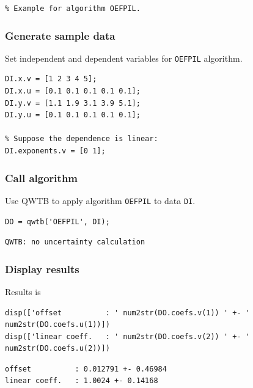 \startcontents[localtoc]

\begin{lstlisting}
% Example for algorithm OEFPIL.
\end{lstlisting}


{}
\subsubsection*{Generate sample data}



Set independent and dependent variables for \texttt{OEFPIL} algorithm.

\begin{lstlisting}
DI.x.v = [1 2 3 4 5];
DI.x.u = [0.1 0.1 0.1 0.1 0.1];
DI.y.v = [1.1 1.9 3.1 3.9 5.1];
DI.y.u = [0.1 0.1 0.1 0.1 0.1];

% Suppose the dependence is linear:
DI.exponents.v = [0 1];
\end{lstlisting}


{}
\subsubsection*{Call algorithm}



Use QWTB to apply algorithm \texttt{OEFPIL} to data \texttt{DI}.

\begin{lstlisting}
DO = qwtb('OEFPIL', DI);
\end{lstlisting}
\begin{lstlisting}[language={},xleftmargin=5pt,frame=none]
QWTB: no uncertainty calculation

\end{lstlisting}


{}
\subsubsection*{Display results}



Results is

\begin{lstlisting}
disp(['offset          : ' num2str(DO.coefs.v(1)) ' +- ' num2str(DO.coefs.u(1))])
disp(['linear coeff.   : ' num2str(DO.coefs.v(2)) ' +- ' num2str(DO.coefs.u(2))])
\end{lstlisting}
\begin{lstlisting}[language={},xleftmargin=5pt,frame=none]
offset          : 0.012791 +- 0.46984
linear coeff.   : 1.0024 +- 0.14168

\end{lstlisting}


